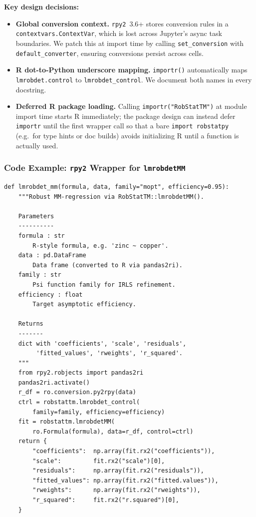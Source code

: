 \documentclass[11pt, a4paper]{article}
\begin{document}
\noindent\textbf{Key design decisions:}

\begin{itemize}[leftmargin=1.5em, itemsep=3pt]
  \item \textbf{Global conversion context.}
    \texttt{rpy2}~3.6+ stores conversion rules in a\\
    \texttt{contextvars.ContextVar}, which is lost across Jupyter's
    async task boundaries.
    We patch this at import time by calling \texttt{set\_conversion}
    with \texttt{default\_converter}, ensuring conversions persist
    across cells.
  \item \textbf{R dot-to-Python underscore mapping.}
    \texttt{importr()} automatically maps\\
    \texttt{lmrobdet.control} to \texttt{lmrobdet\_control}.
    We document both names in every docstring.
  \item \textbf{Deferred R package loading.}
    Calling \texttt{importr("RobStatTM")} at module import time starts R
    immediately; the package design can instead defer \texttt{importr}
    until the first wrapper call so that a bare \texttt{import robstatpy}
    (e.g.\ for type hints or doc builds) avoids initializing R until a
    function is actually used.
\end{itemize}


\subsubsection*{Code Example: \texttt{rpy2} Wrapper for \texttt{lmrobdetMM}}

\begin{lstlisting}[style=python, title={\footnotesize rpy2 wrapper for \texttt{lmrobdetMM} (mopt family, efficiency\,=\,0.95)}]
def lmrobdet_mm(formula, data, family="mopt", efficiency=0.95):
    """Robust MM-regression via RobStatTM::lmrobdetMM().

    Parameters
    ----------
    formula : str
        R-style formula, e.g. 'zinc ~ copper'.
    data : pd.DataFrame
        Data frame (converted to R via pandas2ri).
    family : str
        Psi function family for IRLS refinement.
    efficiency : float
        Target asymptotic efficiency.

    Returns
    -------
    dict with 'coefficients', 'scale', 'residuals',
         'fitted_values', 'rweights', 'r_squared'.
    """
    from rpy2.robjects import pandas2ri
    pandas2ri.activate()
    r_df = ro.conversion.py2rpy(data)
    ctrl = robstattm.lmrobdet_control(
        family=family, efficiency=efficiency)
    fit = robstattm.lmrobdetMM(
        ro.Formula(formula), data=r_df, control=ctrl)
    return {
        "coefficients":  np.array(fit.rx2("coefficients")),
        "scale":         fit.rx2("scale")[0],
        "residuals":     np.array(fit.rx2("residuals")),
        "fitted_values": np.array(fit.rx2("fitted.values")),
        "rweights":      np.array(fit.rx2("rweights")),
        "r_squared":     fit.rx2("r.squared")[0],
    }
\end{lstlisting}
\end{document}
